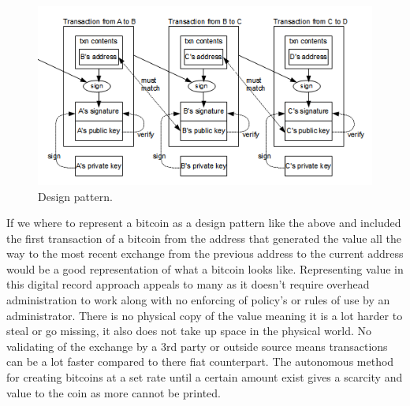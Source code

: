 \begin{figure}[H]
\centering
\includegraphics[scale=0.55]{img/bitcoindesign.png}
\caption{Design pattern.}
\end{figure}

If we where to represent a bitcoin as a design pattern like the above and included the first transaction of a bitcoin from the address that generated the value all the way to the most recent exchange from the previous address to the current address would be a good representation of what a bitcoin looks like. Representing value in this digital record approach appeals to many as it doesn't require overhead administration  to work along with no enforcing of policy's or rules of use by an administrator. There is no physical copy of the value meaning it is a lot harder to steal or go missing, it also does not take up space in the physical world. No validating of the exchange by a 3rd party or outside source means transactions can be a lot faster compared to there fiat counterpart. The autonomous method for creating bitcoins at a set rate until a certain amount exist gives a scarcity and value to the coin as more cannot be printed.


